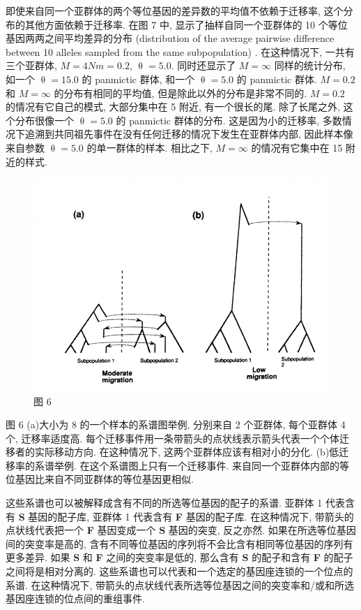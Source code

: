 \documentclass[12pt]{article}
\begin{document}
即使来自同一个亚群体的两个等位基因的差异数的平均值不依赖于迁移率, 这个分布的其他方面依赖于迁移率. 在图 7 中,
显示了抽样自同一个亚群体的 10 个等位基因两两之间平均差异的分布 (distribution of the average pairwise difference
between 10 alleles sampled from the same subpopulation) . 在这种情况下, 一共有三个亚群体, $M=4Nm=0.2$,
$\uptheta =5.0$. 同时还显示了 $M=\mathrm{\infty}$ 同样的统计分布, 如一个 $\uptheta =15.0$ 的 panmictic 群体,
和一个 $\uptheta =5.0$ 的 panmictic 群体. $M=0.2$ 和 $M=\mathrm{\infty}$ 的分布有相同的平均值,
但是除此以外的分布是非常不同的. $M=0.2$ 的情况有它自己的模式, 大部分集中在 5 附近, 有一个很长的尾. 除了长尾之外,
这个分布很像一个 $\uptheta =5.0$ 的 panmictic 群体的分布. 这是因为小的迁移率,
多数情况下追溯到共同祖先事件在没有任何迁移的情况下发生在亚群体内部, 因此样本像来自参数 $\uptheta =5.0$ 的单一群体的样本.
相比之下, $M=\mathrm{\infty }$ 的情况有它集中在 15 附近的样式.

\begin{figure}
    \centering
    \includegraphics{coalescent-process.images/image6.png}
    \caption{图 6}
\end{figure}

图 6 (a)大小为 8 的一个样本的系谱图举例, 分别来自 2 个亚群体, 每个亚群体 4 个, 迁移率适度高.
每个迁移事件用一条带箭头的点状线表示箭头代表一个个体迁移者的实际移动方向. 在这种情况下, 这两个亚群体应该有相对小的分化.
(b)低迁移率的系谱举例. 在这个系谱图上只有一个迁移事件. 来自同一个亚群体内部的等位基因比来自不同亚群体的等位基因更相似.

这些系谱也可以被解释成含有不同的所选等位基因的配子的系谱. 亚群体 1 代表含有 \textbf{S} 基因的配子库, 亚群体 1 代表含有
\textbf{F} 基因的配子库. 在这种情况下, 带箭头的点状线代表把一个 \textbf{F} 基因变成一个 \textbf{S} 基因的突变,
反之亦然. 如果在所选等位基因间的突变率是高的, 含有不同等位基因的序列将不会比含有相同等位基因的序列有更多差异. 如果
\textbf{S} 和 \textbf{F} 之间的突变率是低的, 那么含有 \textbf{S} 的配子和含有 \textbf{F}
的配子之间将是相对分离的. 这些系谱也可以代表和一个选定的基因座连锁的一个位点的系谱. 在这种情况下,
带箭头的点状线代表所选等位基因之间的突变率和/或和所选基因座连锁的位点间的重组事件.
\end{document}
